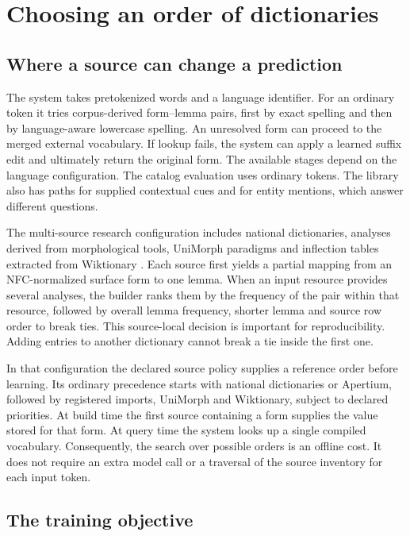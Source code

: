 \documentclass[11pt]{article}
\begin{document}
\section{Choosing an order of dictionaries}
\label{sec:method}

\subsection{Where a source can change a prediction}

The system takes pretokenized words and a language identifier. For an ordinary
token it tries corpus-derived form--lemma pairs, first by exact spelling and
then by language-aware lowercase spelling. An unresolved form can proceed
to the merged external vocabulary. If lookup fails, the system can apply a
learned suffix edit and ultimately return the original form. The available
stages depend on the language configuration. The catalog evaluation uses
ordinary tokens. The library also has paths for supplied contextual cues
and for entity mentions, which answer different questions.

The multi-source research configuration includes national dictionaries, analyses derived from
morphological tools, UniMorph paradigms \citep{kirov-etal-2018-unimorph}
and inflection tables extracted from Wiktionary
\citep{ylonen-2022-wiktextract}. Each source first yields a partial mapping
from an NFC-normalized surface form to one lemma. When an input resource
provides several analyses, the builder ranks them by the frequency of the
pair within that resource, followed by overall lemma frequency, shorter lemma
and source row order to break ties. This source-local decision is important
for reproducibility. Adding entries to another dictionary cannot break a tie
inside the first one.

In that configuration the declared source policy supplies a reference order before learning.
Its ordinary precedence starts with national dictionaries or Apertium,
followed by registered imports, UniMorph and Wiktionary, subject to declared
priorities. At build time the first source containing a form supplies the
value stored for that form. At query time the system looks up a single
compiled vocabulary. Consequently, the search over possible orders is an
offline cost. It does not require an extra model call or a traversal of the
source inventory for each input token.

\subsection{The training objective}
\end{document}
